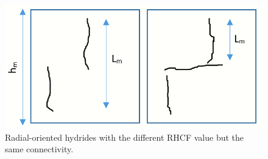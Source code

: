 \begin{figure}[h] %
    \centering
    \includegraphics[width=4.5in]{Figures/3-Limitations/RHCF comparison 2.png}
    \caption{Radial-oriented hydrides with the different RHCF value but the same connectivity.}
    \label{fig:sameconnectivity}
\end{figure}
